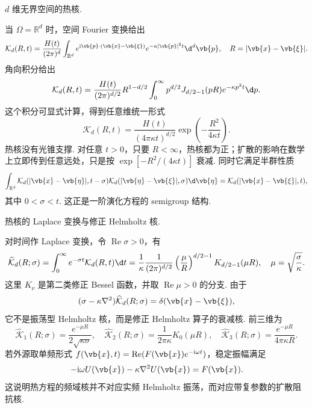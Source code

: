 \begin{example}
	\(d\) 维无界空间的热核.
	
	当 \(\Omega=\mathbb{R}^d\) 时，空间 Fourier 变换给出
	\begin{equation*}
		\mathcal{K}_d(R,t)
		=\frac{H(t)}{(2\pi)^d}\int_{\mathbb{R}^d}
		e^{\mathrm{i}\vb{p}\cdot(\vb{x}-\vb{\xi})}e^{-\kappa|\vb{p}|^2t}\d^d\vb{p},
		\quad R=|\vb{x}-\vb{\xi}|.
	\end{equation*}
	角向积分给出
	\begin{equation*}
		\mathcal{K}_d(R,t)
		=\frac{H(t)}{(2\pi)^{d/2}}R^{1-d/2}
		\int_0^\infty p^{d/2}J_{d/2-1}(pR)e^{-\kappa p^2t}\d p.
	\end{equation*}
	这个积分可显式计算，得到任意维统一形式
	\begin{equation*}
		\mathcal{K}_d(R,t)
		=\frac{H(t)}{(4\pi\kappa t)^{d/2}}
		\exp\left(-\frac{R^2}{4\kappa t}\right).
	\end{equation*}
	热核没有光锥支撑. 对任意 \(t>0\)，只要 \(R<\infty\)，热核都为正；扩散的影响在数学上立即传到任意远处，只是按 \(\exp[-R^2/(4\kappa t)]\) 衰减. 同时它满足半群性质
	\begin{equation*}
		\int_{\mathbb{R}^d}\mathcal{K}_d(|\vb{x}-\vb{\eta}|,t-\sigma)
		\mathcal{K}_d(|\vb{\eta}-\vb{\xi}|,\sigma)\d\vb{\eta}
		=\mathcal{K}_d(|\vb{x}-\vb{\xi}|,t),
	\end{equation*}
	其中 \(0<\sigma<t\). 这正是一阶演化方程的 semigroup 结构.
\end{example}

\begin{example}
	热核的 Laplace 变换与修正 Helmholtz 核.
	
	对时间作 Laplace 变换，令 \(\operatorname{Re}\sigma>0\)，有
	\begin{equation*}
		\widehat{\mathcal{K}}_d(R;\sigma)
		=\int_0^\infty e^{-\sigma t}\mathcal{K}_d(R,t)\d t
		=\frac{1}{\kappa}\frac{1}{(2\pi)^{d/2}}
		\left(\frac{\mu}{R}\right)^{d/2-1}K_{d/2-1}(\mu R),
		\quad
		\mu=\sqrt{\frac{\sigma}{\kappa}}.
	\end{equation*}
	这里 \(K_\nu\) 是第二类修正 Bessel 函数，并取 \(\operatorname{Re}\mu>0\) 的分支. 由于
	\begin{equation*}
		(\sigma-\kappa\nabla^2)\widehat{\mathcal{K}}_d(R;\sigma)=\delta(\vb{x}-\vb{\xi}),
	\end{equation*}
	它不是振荡型 Helmholtz 核，而是修正 Helmholtz 算子的衰减核. 前三维为
	\begin{equation*}
		\widehat{\mathcal{K}}_1(R;\sigma)=\frac{e^{-\mu R}}{2\sqrt{\kappa\sigma}},
		\quad
		\widehat{\mathcal{K}}_2(R;\sigma)=\frac{1}{2\pi\kappa}K_0(\mu R),
		\quad
		\widehat{\mathcal{K}}_3(R;\sigma)=\frac{e^{-\mu R}}{4\pi\kappa R}.
	\end{equation*}
	若外源取单频形式 \(f(\vb{x},t)=\operatorname{Re}(F(\vb{x})e^{-\mathrm{i}\omega t})\)，稳定振幅满足
	\begin{equation*}
		-\mathrm{i}\omega U(\vb{x})-\kappa\nabla^2U(\vb{x})=F(\vb{x}).
	\end{equation*}
	这说明热方程的频域核并不对应实频 Helmholtz 振荡，而对应带复参数的扩散阻抗核.
\end{example}